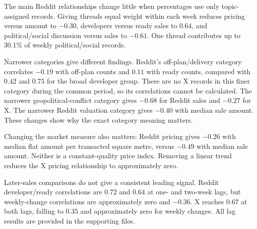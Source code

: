The main Reddit relationships change little when percentages use only topic-assigned records. Giving threads equal weight within each week reduces pricing versus amount to $-0.30$, developers versus ready sales to $0.64$, and political/social discussion versus sales to $-0.61$. One thread contributes up to 30.1\% of weekly political/social records.

Narrower categories give different findings. Reddit's off-plan/delivery category correlates $-0.19$ with off-plan counts and $0.11$ with ready counts, compared with $0.42$ and $0.75$ for the broad developer group. There are no X records in this finer category during the common period, so its correlations cannot be calculated. The narrower geopolitical-conflict category gives $-0.68$ for Reddit sales and $-0.27$ for X. The narrower Reddit valuation category gives $-0.40$ with median sale amount. These changes show why the exact category meaning matters.

Changing the market measure also matters: Reddit pricing gives $-0.26$ with median flat amount per transacted square metre, versus $-0.49$ with median sale amount. Neither is a constant-quality price index. Removing a linear trend reduces the X pricing relationship to approximately zero.

Later-sales comparisons do not give a consistent leading signal. Reddit developer/ready correlations are $0.72$ and $0.64$ at one- and two-week lags, but weekly-change correlations are approximately zero and $-0.36$. X reaches $0.67$ at both lags, falling to $0.35$ and approximately zero for weekly changes. All lag results are provided in the supporting files.
